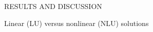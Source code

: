 \cleardoublepage



\chap RESULTS AND DISCUSSION

%
%
%
%
%
%
%

\sec Linear (LU) versus nonlinear (NLU) solutions


